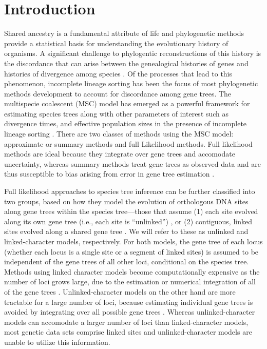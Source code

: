 \section{Introduction}

Shared ancestry is a fundamental attribute of life and phylogenetic methods 
provide a statistical basis for understanding the evolutionary history of organisms.
A significant challenge to phylogentic reconstructions of this history is the 
discordance that can arise between the genealogical histories of genes and 
histories of divergence among species \citep{maddisonGeneTreesSpecies1997}.
Of the processes that lead to this phenomenon, incomplete lineage sorting has 
been the focus of most phylogenetic methods development to account for discordance
among gene trees. The multispecie coalescent (MSC) model has emerged as a 
powerful framework for estimating species trees along with other parameters of 
interest such as divergence times, and effective population sizes in the 
presence of incomplete lineage sorting \citep{xuChallengesSpeciesTree2016}.
There are two classes of methods using the MSC model: approximate or summary 
methods and full Likelihood methods. Full likelihood methods are ideal because they 
integrate over gene trees and accomodate uncertainty, whereas summary methods 
treat gene trees as observed data and are thus susceptible to bias arising from 
error in gene tree estimation \citep{rannalaEfficientBayesianSpecies2017}.

Full likelihood approaches to species 
tree inference can be further classified into two groups, based on how they model the 
evolution of orthologous DNA sites along gene trees within the species 
tree---those that assume (1) each site evolved along its own gene tree 
(i.e., each site is ``unlinked'') 
\citep{bryantInferringSpeciesTrees2012, maioPoMoAlleleFrequencyBased2015}, 
or (2) contiguous, linked sites evolved along a shared gene tree 
\citep{liuSpeciesTreesGene2007, Heled2010, ogilvieStarBEAST2BringsFaster2017, 
yangBPPProgramSpecies2015}. We will refer to these as unlinked and 
linked-character models, respectively. For both models, the gene tree of each 
locus (whether each locus is a single site or a segment of linked sites) 
is assumed to be independent of the gene 
trees of all other loci, conditional on the species tree.
Methods using linked character models become computationally expensive as the
number of loci grows large, due to the estimation or numerical integration of
all of the gene trees \citep{bryantInferringSpeciesTrees2012}.
Unlinked-character models on the other 
hand are more tractable for a large number of loci, because  estimating 
individual gene trees is avoided by integrating over all possible gene trees 
\citep{bryantInferringSpeciesTrees2012}.
Whereas unlinked-character models can accomodate a larger number of loci than
linked-character models, most genetic data sets comprise linked sites and
unlinked-character models are unable to utilize this information.

